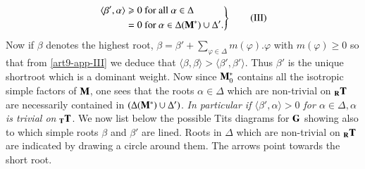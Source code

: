 \begin{equation*}
\left. 
\begin{aligned}
\langle \beta' ,\alpha \rangle & \geqslant 0 \text{ for all } \alpha \in \Delta \\
& = 0 \text{ for } \alpha \in \Delta (\mathbf{M}^\ast) \cup \Delta'. 
\end{aligned}
\right\}
\tag{III}\label{art9-app-III}
\end{equation*}
Now if $\beta$ denotes the highest root, $\beta = \beta' + \sum\limits_{\varphi \in \Delta} m (\varphi). \varphi$ with $m(\varphi) \geqslant 0$ so that from \ref{art9-app-III} we deduce that $\langle \beta, \beta \rangle > \langle \beta', \beta' \rangle$. Thus $\beta'$ is the unique short\pageoriginale root which is a dominant weight. Now since $\mathbf{M}^\ast_0$ contains all the isotropic simple factors of $\mathbf{M}$, one sees that the roots $\alpha \in \Delta$ which are non-trivial on ${}_{\mathbf{R}} \mathbf{T}$ are necessarily contained in $(\Delta (\mathbf{M}^\ast) \cup \Delta')$. \textit{ In particular if $\langle \beta', \alpha \rangle > 0$ for $\alpha \in \Delta, \alpha$ is trivial on ${}_{\mathbf{T}} \mathbf{T}$}. We now list below the possible Tits diagrams for $\mathbf{G}$ showing also to which simple roots $\beta$ and $\beta'$ are lined. Roots in $\Delta$ which are non-trivial on ${}_{\mathbf{R}} \mathbf{T}$ are indicated by drawing a circle around them. The arrows point towards the short root.

